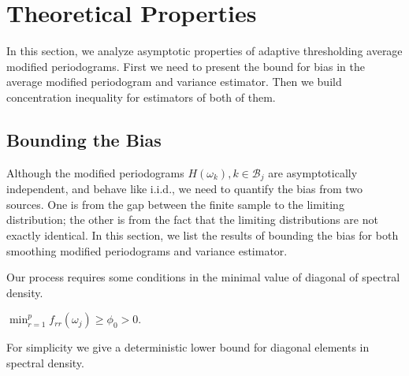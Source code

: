 \section{Theoretical Properties}\label{sec:theory}
In this section, we analyze asymptotic properties of adaptive thresholding average modified periodograms. First we need to present the bound for bias in the average modified periodogram and variance estimator. Then we build concentration inequality for estimators of both of them. 


\subsection{Bounding the Bias}
Although the modified periodograms $H(\omega_k), k\in \mathcal{B}_j$  are asymptotically independent, and behave like i.i.d., we need to quantify the bias from two sources. One is from the gap between the finite sample to the limiting distribution; the other is from the fact that the limiting distributions are not exactly identical. In this section, we list the results of bounding the bias for both smoothing modified periodograms and variance estimator. \par 

Our process requires some conditions in the minimal value of diagonal of spectral density. 
\begin{assumption}
$\min_{r=1}^p f_{rr}(\omega_j) \ge \phi_0 > 0$.
\end{assumption}
For simplicity we give a deterministic lower bound for diagonal elements in spectral density. 

